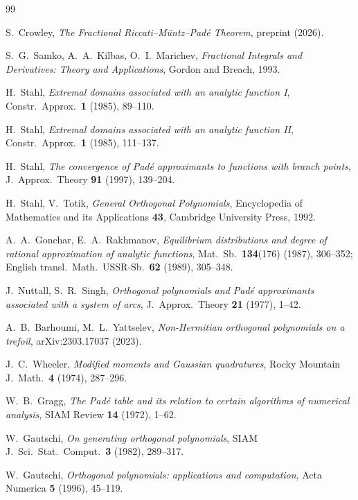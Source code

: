 \documentclass{article}
\begin{document}
\begin{thebibliography}{99}

S.~Crowley,
\emph{The Fractional Riccati--Müntz--Padé Theorem},
preprint (2026).

S.~G.~Samko, A.~A.~Kilbas, O.~I.~Marichev,
\emph{Fractional Integrals and Derivatives: Theory and Applications},
Gordon and Breach, 1993.

H.~Stahl,
\emph{Extremal domains associated with an analytic function I},
Constr.\ Approx.\ \textbf{1} (1985), 89--110.

H.~Stahl,
\emph{Extremal domains associated with an analytic function II},
Constr.\ Approx.\ \textbf{1} (1985), 111--137.

H.~Stahl,
\emph{The convergence of Padé approximants to functions with branch points},
J.\ Approx.\ Theory \textbf{91} (1997), 139--204.

H.~Stahl, V.~Totik,
\emph{General Orthogonal Polynomials},
Encyclopedia of Mathematics and its Applications \textbf{43},
Cambridge University Press, 1992.

A.~A.~Gonchar, E.~A.~Rakhmanov,
\emph{Equilibrium distributions and degree of rational approximation of
analytic functions},
Mat.\ Sb.\ \textbf{134}(176) (1987), 306--352;
English transl.\ Math.\ USSR-Sb.\ \textbf{62} (1989), 305--348.

J.~Nuttall, S.~R.~Singh,
\emph{Orthogonal polynomials and Padé approximants associated with a system
of arcs},
J.\ Approx.\ Theory \textbf{21} (1977), 1--42.

A.~B.~Barhoumi, M.~L.~Yattselev,
\emph{Non-Hermitian orthogonal polynomials on a trefoil},
arXiv:2303.17037 (2023).

J.~C.~Wheeler,
\emph{Modified moments and Gaussian quadratures},
Rocky Mountain J.\ Math.\ \textbf{4} (1974), 287--296.

W.~B.~Gragg,
\emph{The Padé table and its relation to certain algorithms of numerical
analysis},
SIAM Review \textbf{14} (1972), 1--62.

W.~Gautschi,
\emph{On generating orthogonal polynomials},
SIAM J.\ Sci.\ Stat.\ Comput.\ \textbf{3} (1982), 289--317.

W.~Gautschi,
\emph{Orthogonal polynomials: applications and computation},
Acta Numerica \textbf{5} (1996), 45--119.


\end{thebibliography}
\end{document}
